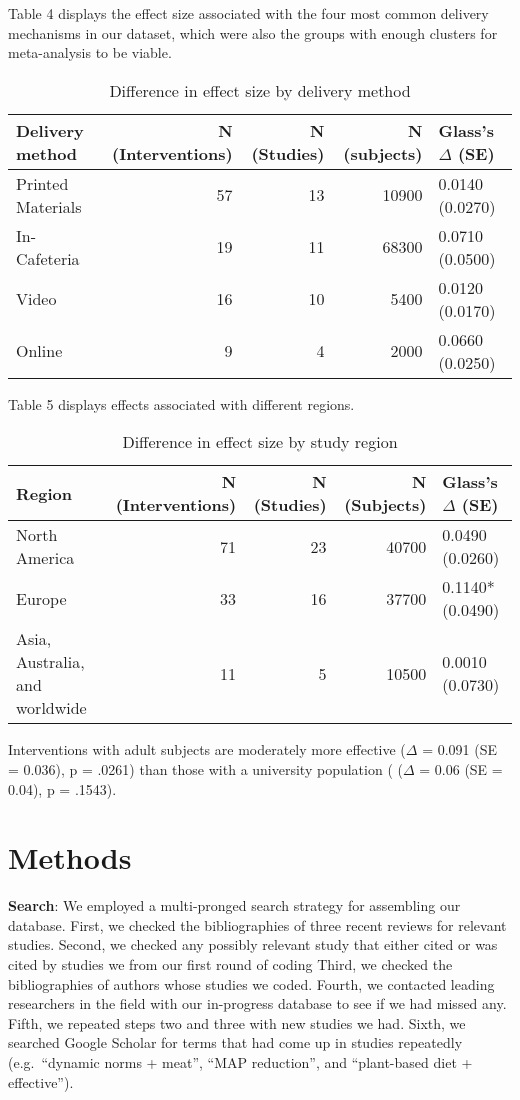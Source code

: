 \documentclass[sn-nature,pdflatex]{sn-jnl}
\begin{document}
Table 4 displays the effect size associated with the four most common
delivery mechanisms in our dataset, which were also the groups with
enough clusters for meta-analysis to be viable.

\begin{table}[!h]
\centering
\caption{\label{tab:table_four}Difference in effect size by delivery method}
\centering
\begin{tabular}[t]{lrrrl}
\toprule
Delivery method & N (Interventions) & N (Studies) & N (subjects) & Glass's $\Delta$ (SE)\\
\midrule
Printed Materials & 57 & 13 & 10900 & 0.0140 (0.0270)\\
In-Cafeteria & 19 & 11 & 68300 & 0.0710 (0.0500)\\
Video & 16 & 10 & 5400 & 0.0120 (0.0170)\\
Online & 9 & 4 & 2000 & 0.0660 (0.0250)\\
\bottomrule
\end{tabular}
\end{table}

Table 5 displays effects associated with different regions.

\begin{table}[!h]
\centering
\caption{\label{tab:table_five}Difference in effect size by study region}
\centering
\begin{tabular}[t]{lrrrl}
\toprule
Region & N (Interventions) & N (Studies) & N (Subjects) & Glass's $\Delta$ (SE)\\
\midrule
North America & 71 & 23 & 40700 & 0.0490 (0.0260)\\
Europe & 33 & 16 & 37700 & 0.1140* (0.0490)\\
Asia, Australia, and worldwide & 11 & 5 & 10500 & 0.0010 (0.0730)\\
\bottomrule
\end{tabular}
\end{table}

Interventions with adult subjects are moderately more effective
(\(\Delta\) = 0.091 (SE = 0.036), p = .0261) than those with a
university population ( (\(\Delta\) = 0.06 (SE = 0.04), p = .1543).

\section{Methods}\label{sec3}

\textbf{Search}: We employed a multi-pronged search strategy for
assembling our database. First, we checked the bibliographies of three
recent reviews
\citep{mathur2021meta, bianchi2018conscious, bianchi2018restructuring}
for relevant studies. Second, we checked any possibly relevant study
that either cited or was cited by studies we from our first round of
coding Third, we checked the bibliographies of authors whose studies we
coded. Fourth, we contacted leading researchers in the field with our
in-progress database to see if we had missed any. Fifth, we repeated
steps two and three with new studies we had. Sixth, we searched Google
Scholar for terms that had come up in studies repeatedly (e.g.~``dynamic
norms + meat'', ``MAP reduction'', and ``plant-based diet +
effective'').
\end{document}
